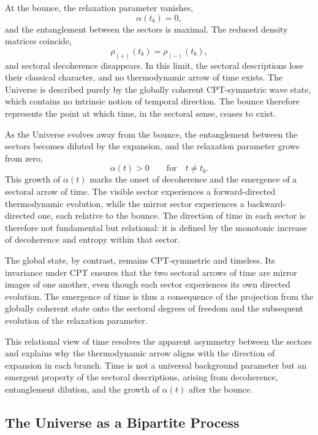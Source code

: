 \documentclass[11pt,a4paper]{article}
\begin{document}
At the bounce, the relaxation parameter vanishes,
\begin{equation}
    \alpha(t_b) = 0,
\end{equation}
and the entanglement between the sectors is maximal. The reduced density matrices coincide,
\begin{equation}
    \rho_{(+)}(t_b) = \rho_{(-)}(t_b),
\end{equation}
and sectoral decoherence disappears. In this limit, the sectoral descriptions lose their classical
character, and no thermodynamic arrow of time exists. The Universe is described purely by the
globally coherent CPT-symmetric wave state, which contains no intrinsic notion of temporal
direction. The bounce therefore represents the point at which time, in the sectoral sense, ceases
to exist.

As the Universe evolves away from the bounce, the entanglement between the sectors becomes
diluted by the expansion, and the relaxation parameter grows from zero,
\begin{equation}
    \alpha(t) > 0 \qquad \text{for} \quad t \neq t_b.
\end{equation}
This growth of $\alpha(t)$ marks the onset of decoherence and the emergence of a sectoral arrow
of time. The visible sector experiences a forward-directed thermodynamic evolution, while the
mirror sector experiences a backward-directed one, each relative to the bounce. The direction of
time in each sector is therefore not fundamental but relational: it is defined by the monotonic
increase of decoherence and entropy within that sector.

The global state, by contrast, remains CPT-symmetric and timeless. Its invariance under CPT
ensures that the two sectoral arrows of time are mirror images of one another, even though each
sector experiences its own directed evolution. The emergence of time is thus a consequence of
the projection from the globally coherent state onto the sectoral degrees of freedom and the
subsequent evolution of the relaxation parameter.

This relational view of time resolves the apparent asymmetry between the sectors and explains
why the thermodynamic arrow aligns with the direction of expansion in each branch. Time is not
a universal background parameter but an emergent property of the sectoral descriptions, arising
from decoherence, entanglement dilution, and the growth of $\alpha(t)$ after the bounce.


\subsection{The Universe as a Bipartite Process}
\end{document}
